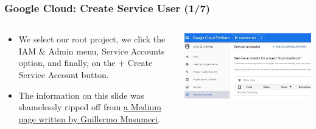 \documentclass[aspectratio=169]{beamer}
\begin{document}
\begin{frame}
	\frametitle{Google Cloud: Create Service User (1/7)}
	\begin{columns}
		\begin{column}{0.5\textwidth}
			\begin{itemize}
				\item We select our root project, we click the IAM \& Admin menu, Service Accounts option, and finally, on the + Create Service Account button.
				\item The information on this slide was shamelessly ripped off from \href{https://gmusumeci.medium.com/how-to-create-a-service-account-for-terraform-in-gcp-google-cloud-platform-f75a0cf918d1}{a Medium page written by Guillermo Musumeci}.
			\end{itemize}
		\end{column}
		\begin{column}{0.5\textwidth}
			\begin{center}
				\includegraphics[width=1.0\textwidth]{../images/gcp-serv-acct1.png}
			\end{center}
		\end{column}
	\end{columns}
\end{frame}
\end{document}
